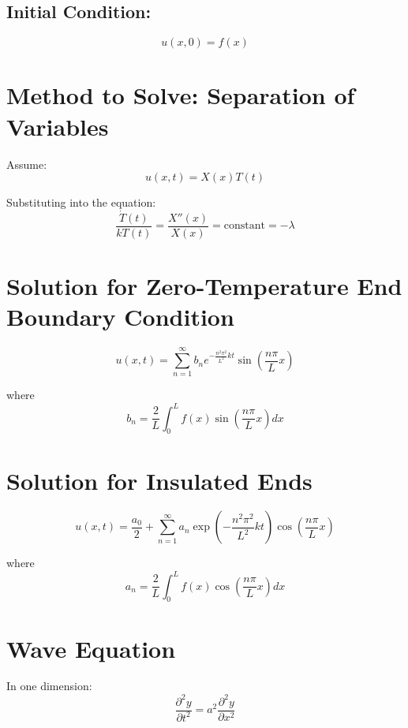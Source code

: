 \documentclass[a4paper,12pt]{article}
\begin{document}
\subsection*{Initial Condition:}
\begin{equation*}
    u(x,0) = f(x)
\end{equation*}

\section*{Method to Solve: Separation of Variables}
Assume:
\begin{equation*}
    u(x,t) = X(x) T(t)
\end{equation*}

Substituting into the equation:
\begin{equation*}
    \frac{\dot{T}(t)}{kT(t)} = \frac{X''(x)}{X(x)} = \text{constant} = -\lambda
\end{equation*}


\section*{Solution for Zero-Temperature End Boundary Condition}
\begin{equation*}
    u(x,t) = \sum_{n=1}^{\infty} b_n e^{-\frac{n^2 \pi^2}{L^2} kt} \sin\left(\frac{n \pi}{L} x\right)
\end{equation*}

where
\begin{equation*}
    b_n = \frac{2}{L} \int_{0}^{L} f(x) \sin\left(\frac{n \pi}{L} x\right) dx
\end{equation*}

\section*{Solution for Insulated Ends}
\begin{equation*}
    u(x,t) = \frac{a_0}{2} + \sum_{n=1}^{\infty} a_n \exp\left(-\frac{n^2 \pi^2}{L^2} k t\right) \cos\left(\frac{n \pi}{L} x\right)
\end{equation*}

where
\begin{equation*}
    a_n = \frac{2}{L} \int_{0}^{L} f(x) \cos\left(\frac{n \pi}{L} x\right) dx
\end{equation*}


\section*{Wave Equation}
In one dimension:
\begin{equation*}
    \frac{\partial^2 y}{\partial t^2} = a^2 \frac{\partial^2 y}{\partial x^2}
\end{equation*}
\end{document}

